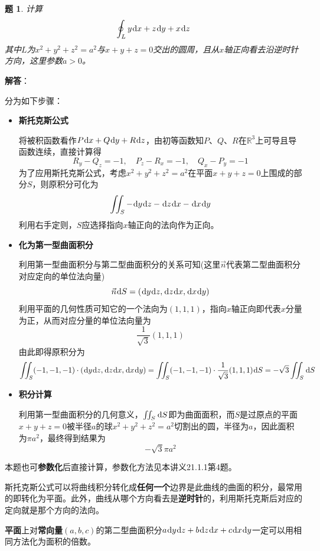 \documentclass[a4paper,UTF8,fontset=windows,AutoFakeBold]{ctexart}
\newcommand*{\dr}{\hspace{0.07em}\mathrm{d}}
\newcommand*{\rb}{\mathbb{R}}
\newcommand*{\note}{\noindent *}
\theoremstyle{ex}
\newtheorem{exercise}{题}
\newcommand{\sol}[1]{{\vspace{5pt}\kaishu\noindent\textbf{解答}：\vspace{-3pt}
\begin{compactitem}
    \item[] #1
\end{compactitem}
}}
\begin{document}
\begin{framed}
\begin{exercise}\label{stolkes circle}
    计算
    $$\oint_Ly\dr x+z\dr y+x\dr z$$
    其中$L$为$x^2+y^2+z^2=a^2$与$x+y+z=0$交出的圆周，且从$x$轴正向看去沿逆时针方向，这里参数$a>0$。
\end{exercise}
\sol{
    分为如下步骤：
    \begin{itemize}
        \item \textbf{斯托克斯公式}
        
        将被积函数看作$P\dr x+Q\dr y+R\dr z$，由初等函数知$P$、$Q$、$R$在$\rb^3$上可导且导函数连续，直接计算得
        $$R_y-Q_z=-1,\quad P_z-R_x=-1,\quad Q_x-P_y=-1$$
        为了应用斯托克斯公式，考虑$x^2+y^2+z^2=a^2$在平面$x+y+z=0$上围成的部分$S$，则原积分可化为
        $$\iint_S-\dr y\dr z-\dr z\dr x-\dr x\dr y$$
        利用右手定则，$S$应选择指向$x$轴正向的法向作为正向。

        \item \textbf{化为第一型曲面积分}
        
        利用第一型曲面积分与第二型曲面积分的关系可知(这里$\vec{n}$代表第二型曲面积分对应定向的单位法向量)
        $$\vec{n}\dr S=(\dr y\dr z,\dr z\dr x,\dr x\dr y)$$
        利用平面的几何性质可知它的一个法向为$(1,1,1)$，指向$x$轴正向即代表$x$分量为正，从而对应分量的单位法向量为
        $$\frac{1}{\sqrt3}(1,1,1)$$
        由此即得原积分为
        $$\iint_S(-1,-1,-1)\cdot(\dr y\dr z,\dr z\dr x,\dr x\dr y)=\iint_S(-1,-1,-1)\cdot\frac{1}{\sqrt3}(1,1,1)\dr S=-\sqrt3\iint_S\dr S$$

        \item \textbf{积分计算}
        
        利用第一型曲面积分的几何意义，$\iint_S\dr S$即为曲面面积，而$S$是过原点的平面$x+y+z=0$被半径$a$的球$x^2+y^2+z^2=a^2$切割出的圆，半径为$a$，因此面积为$\pi a^2$，最终得到结果为
        $$-\sqrt3\pi a^2$$
    \end{itemize}

    \note 本题也可\textbf{参数化}后直接计算，参数化方法见本讲义21.1.1第4题。
}
\end{framed}

\note 斯托克斯公式可以将曲线积分转化成\textbf{任何一个}边界是此曲线的曲面的积分，最常用的即转化为平面。此外，曲线从哪个方向看去是\textbf{逆时针}的，利用斯托克斯后对应的定向就是那个方向的法向。

\note \textbf{平面}上对\textbf{常向量}$(a,b,c)$的第二型曲面积分$a\dr y\dr z+b\dr z\dr x+c\dr x\dr y$一定可以用相同方法化为面积的倍数。
\end{document}
